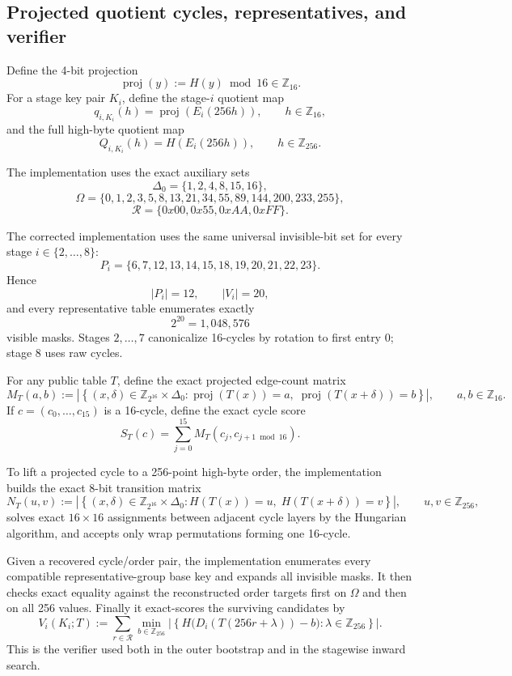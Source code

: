 \documentclass[11pt]{article}
\newcommand{\Z}[1]{\mathbb{Z}_{#1}}
\newcommand{\proj}{\operatorname{proj}}
\begin{document}
\subsection{Projected quotient cycles, representatives, and verifier}
Define the 4-bit projection
\[
\proj(y):=H(y)\bmod 16\in\Z{16}.
\]
For a stage key pair $K_i$, define the stage-$i$ quotient map
\[
q_{i,K_i}(h)=\proj(E_i(256h)),
\qquad h\in\Z{16},
\]
and the full high-byte quotient map
\[
Q_{i,K_i}(h)=H(E_i(256h)),
\qquad h\in\Z{256}.
\]

The implementation uses the exact auxiliary sets
\[
\Delta_0=\{1,2,4,8,15,16\},
\]
\[
\Omega=\{0,1,2,3,5,8,13,21,34,55,89,144,200,233,255\},
\]
\[
\mathcal R=\{0x00,0x55,0xAA,0xFF\}.
\]

The corrected implementation uses the same universal invisible-bit set for every stage $i\in\{2,\dots,8\}$:
\[
P_i=\{6,7,12,13,14,15,18,19,20,21,22,23\}.
\]
Hence
\[
|P_i|=12,\qquad |V_i|=20,
\]
and every representative table enumerates exactly
\[
2^{20}=1{,}048{,}576
\]
visible masks. Stages $2,\dots,7$ canonicalize 16-cycles by rotation to first entry $0$; stage 8 uses raw cycles.

For any public table $T$, define the exact projected edge-count matrix
\[
M_T(a,b)
:=
\left|
\left\{
(x,\delta)\in \Z{2^{16}}\times \Delta_0 :
\proj(T(x))=a,\;
\proj(T(x+\delta))=b
\right\}
\right|,
\qquad a,b\in\Z{16}.
\]
If $c=(c_0,\dots,c_{15})$ is a 16-cycle, define the exact cycle score
\[
S_T(c)=\sum_{j=0}^{15}M_T(c_j,c_{j+1\bmod 16}).
\]

To lift a projected cycle to a 256-point high-byte order, the implementation builds the exact 8-bit transition matrix
\[
N_T(u,v)
:=
\left|
\left\{
(x,\delta)\in \Z{2^{16}}\times \Delta_0 :
H(T(x))=u,\;
H(T(x+\delta))=v
\right\}
\right|,
\qquad u,v\in\Z{256},
\]
solves exact $16\times 16$ assignments between adjacent cycle layers by the Hungarian algorithm, and accepts only wrap permutations forming one 16-cycle.

Given a recovered cycle/order pair, the implementation enumerates every compatible representative-group base key and expands all invisible masks. It then checks exact equality against the reconstructed order targets first on $\Omega$ and then on all 256 values. Finally it exact-scores the surviving candidates by
\[
V_i(K_i;T)
:=
\sum_{r\in\mathcal R}
\min_{b\in\Z{256}}
\left|
\left\{
H\bigl(D_i(T(256r+\lambda))-b\bigr):\lambda\in\Z{256}
\right\}
\right|.
\]
This is the verifier used both in the outer bootstrap and in the stagewise inward search.
\end{document}

